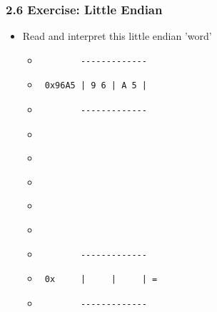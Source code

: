 \begin{frame}[fragile]
  \frametitle{2.6 Exercise: Little Endian}
    \begin{itemize}
        \item[] Read and interpret this little endian 'word'
            \begin{itemize}
                \item[] \begin{verbatim}        ------------- \end{verbatim}
                \item[] \begin{verbatim} 0x96A5 | 9 6 | A 5 | \end{verbatim}
                \item[] \begin{verbatim}        ------------- \end{verbatim}
                \item[] \begin{verbatim}                      \end{verbatim}
                \item[] \begin{verbatim}                      \end{verbatim}
                \item[] \begin{verbatim}                      \end{verbatim}
                \item[] \begin{verbatim}                      \end{verbatim}
                \item[] \begin{verbatim}                      \end{verbatim}
                \item[] \begin{verbatim}        ------------- \end{verbatim}
                \item[] \begin{verbatim} 0x     |     |     | =  \end{verbatim}
                \item[] \begin{verbatim}        ------------- \end{verbatim}
            \end{itemize}
    \end{itemize}
\end{frame}


